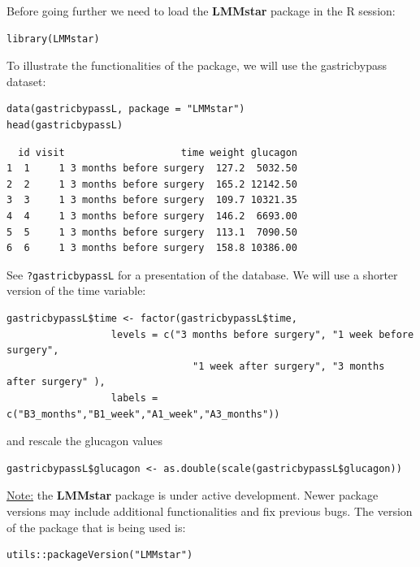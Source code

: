 \documentclass[12pt]{article}
\begin{document}
\clearpage

Before going further we need to load the \textbf{LMMstar} package in the R
session:
\lstset{language=r,label= ,caption= ,captionpos=b,numbers=none}
\begin{lstlisting}
library(LMMstar)
\end{lstlisting}

To illustrate the functionalities of the package, we will use the
gastricbypass dataset:
\lstset{language=r,label= ,caption= ,captionpos=b,numbers=none}
\begin{lstlisting}
data(gastricbypassL, package = "LMMstar")
head(gastricbypassL)
\end{lstlisting}

\begin{verbatim}
  id visit                    time weight glucagon
1  1     1 3 months before surgery  127.2  5032.50
2  2     1 3 months before surgery  165.2 12142.50
3  3     1 3 months before surgery  109.7 10321.35
4  4     1 3 months before surgery  146.2  6693.00
5  5     1 3 months before surgery  113.1  7090.50
6  6     1 3 months before surgery  158.8 10386.00
\end{verbatim}


See \texttt{?gastricbypassL} for a presentation of the database. We will use a shorter version of the time variable:
\lstset{language=r,label= ,caption= ,captionpos=b,numbers=none}
\begin{lstlisting}
gastricbypassL$time <- factor(gastricbypassL$time,
			      levels = c("3 months before surgery", "1 week before surgery",
							    "1 week after surgery", "3 months after surgery" ),
			      labels = c("B3_months","B1_week","A1_week","A3_months"))
\end{lstlisting}
and rescale the glucagon values
\lstset{language=r,label= ,caption= ,captionpos=b,numbers=none}
\begin{lstlisting}
gastricbypassL$glucagon <- as.double(scale(gastricbypassL$glucagon))
\end{lstlisting}

\bigskip

\uline{Note:} the \textbf{LMMstar} package is under active development. Newer
package versions may include additional functionalities and fix
previous bugs. The version of the package that is being used is:
\lstset{language=r,label= ,caption= ,captionpos=b,numbers=none}
\begin{lstlisting}
utils::packageVersion("LMMstar")
\end{lstlisting}
\end{document}
